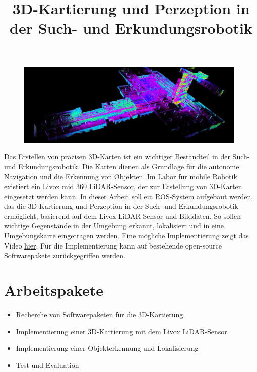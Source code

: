 \documentclass[a4paper,11pt]{article}
\title{\textcolor{ohm_red}{3D-Kartierung und Perzeption in der Such- und Erkundungsrobotik}}
\date{}
\begin{document}
\maketitle
\thispagestyle{fancy}

\vspace*{-3cm}
\begin{figure}[h!]
    \centering
    \includegraphics[height=4cm]{img/livox_map.png}
\end{figure}

Das Erstellen von präzisen 3D-Karten ist ein wichtiger Bestandteil in der Such- und Erkundungsrobotik. Die Karten dienen als Grundlage für die autonome Navigation und die Erkennung von Objekten. Im Labor für mobile Robotik existiert ein \href{https://www.livoxtech.com/de/mid-360}{Livox mid 360 LiDAR-Sensor}, der zur Erstellung von 3D-Karten eingesetzt werden kann. In dieser Arbeit soll ein ROS-System aufgebaut werden, das die 3D-Kartierung und Perzeption in der Such- und Erkundungsrobotik ermöglicht, basierend auf dem Livox LiDAR-Sensor und Bilddaten. So sollen wichtige Gegenstände in der Umgebung erkannt, lokalisiert und in eine Umgebungskarte eingetragen werden.
Eine mögliche Implementierung zeigt das Video \href{https://www.youtube.com/watch?v=adALW9jCwtc}{hier}.
Für die Implementierung kann auf bestehende open-source Softwarepakete zurückgegriffen werden. 

\section*{Arbeitspakete}
\begin{itemize}[leftmargin=0.5cm]
    \item Recherche von Softwarepaketen für die 3D-Kartierung
    \item Implementierung einer 3D-Kartierung mit dem Livox LiDAR-Sensor
    \item Implementierung einer Objekterkennung und Lokalisierung
    \item Test und Evaluation 
\end{itemize}
\end{document}
